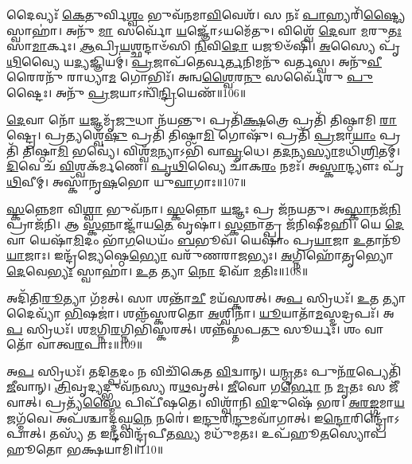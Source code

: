 𑌦𑍈𑌵𑍍𑌯𑌃᳴ \ul{𑌕𑍇}\-𑌤𑍁𑌰𑍍𑌵𑌿\-\ul{𑌶𑍍𑌵𑌂} 𑌭𑍁𑌵᳴𑌨𑌮𑌾\-\ul{𑌵𑌿}\-𑌵𑍇𑌶᳴।
𑌸 𑌨𑌃᳴ \ul{𑌪𑌾}\-𑌹𑍍𑌯𑌰𑌿᳴\-\ul{𑌷𑍍𑌟𑍍𑌯𑍈} 𑌸𑍍𑌵𑌾𑌹𑌾॑।
𑌅𑌨𑍁᳴ \ul{𑌮𑌾} 𑌸𑌰𑍍𑌵𑍋᳴ \ul{𑌯}\-𑌜𑍍𑌞𑍋᳴\-𑌽𑌯𑌮𑍇᳴𑌤𑍁।
𑌵𑌿𑌶𑍍𑌵𑍇᳴ \ul{𑌦𑍇}\-𑌵𑌾 \ul{𑌮}\-𑌰𑍁\-\ul{𑌤𑌃} 𑌸𑌾\-\ul{𑌮𑌾}\-𑌰𑍍𑌕𑌃।
\-\ul{𑌆}\-𑌪𑍍𑌰𑌿\-\ul{𑌯}\-𑌶𑍍𑌛𑌨𑍍𑌦𑌾𑍞᳴𑌸𑌿 \ul{𑌨𑌿}\-𑌵𑌿\-\ul{𑌦𑍋} 𑌯𑌜𑍂𑍞᳴𑌷𑌿।
\-\ul{𑌅}\-𑌸𑍍𑌯𑍈 𑌪𑍃᳴\-\ul{𑌥𑌿}\-𑌵𑍍𑌯𑍈 𑌯\-\ul{𑌦𑍍𑌯}\-𑌜𑍍𑌞𑌿𑌯𑌮𑍍॑।
\-\ul{𑌪𑍍𑌰}\-𑌜𑌾𑌪᳴𑌤𑍇𑌰𑍍𑌵\-\ul{𑌰𑍍𑌤}\-𑌨𑌿𑌮𑌨𑍁᳴ 𑌵𑌰𑍍𑌤𑌸𑍍𑌵।
𑌅𑌨𑍁᳴\-\ul{𑌵𑍀}\-𑌰𑍈𑌰𑌨𑍁᳴ 𑌰𑌾𑌧𑍍𑌯𑌾\-\ul{𑌮} 𑌗𑍋𑌭𑌿𑌃᳴।
𑌅𑌨𑍍𑌵\-\ul{𑌶𑍍𑌵𑍈}\-𑌰\-\ul{𑌨𑍁}\- 𑌸𑌰𑍍𑌵𑍈᳴𑌰𑍁 \ul{𑌪𑍁}\-𑌷𑍍𑌟𑍈𑌃।
𑌅𑌨𑍁᳴ \ul{𑌪𑍍𑌰}\-𑌜𑌯𑌾\-𑌽𑌨𑍍𑌵𑌿᳴\-\ul{𑌨𑍍𑌦𑍍𑌰𑌿}\-𑌯𑍇𑌣᳴॥106॥

\-\ul{𑌦𑍇}\-𑌵𑌾 𑌨𑍋᳴ \ul{𑌯}\-𑌜𑍍𑌞𑌮𑍃᳴\-\ul{𑌜𑍁}\-𑌧𑌾 𑌨᳴𑌯𑌨𑍍𑌤𑍁।
𑌪𑍍𑌰𑌤𑌿᳴\-\-\ul{𑌕𑍍𑌷}\-𑌤𑍍𑌰𑍇 𑌪𑍍𑌰𑌤𑌿᳴ 𑌤𑌿𑌷𑍍𑌠𑌾𑌮𑌿 \ul{𑌰𑌾}\-𑌷𑍍𑌟𑍍𑌰𑍇।
𑌪𑍍𑌰𑌤𑍍𑌯𑌶𑍍𑌵𑍇᳴\-\ul{𑌷𑍁} 𑌪𑍍𑌰𑌤𑌿᳴ 𑌤𑌿𑌷𑍍𑌠𑌾\-\ul{𑌮𑌿} 𑌗𑍋𑌷𑍁᳴।
𑌪𑍍𑌰𑌤𑌿᳴ \ul{𑌪𑍍𑌰}\-𑌜𑌾\-\ul{𑌯𑌾𑌂} 𑌪𑍍𑌰𑌤𑌿᳴ 𑌤𑌿𑌷𑍍𑌠𑌾\-\ul{𑌮𑌿} 𑌭𑌵𑍍𑌯𑍇॑।
𑌵𑌿𑌶𑍍𑌵᳴\-\ul{𑌮}\-𑌨𑍍𑌯𑌾𑌽𑌭𑌿᳴ 𑌵𑌾\-\ul{𑌵𑍃}\-𑌧𑍇।
𑌤\-\ul{𑌦}\-𑌨𑍍𑌯\-\ul{𑌸𑍍𑌯𑌾}\-𑌮𑌧𑌿᳴\-\ul{𑌶𑍍𑌰𑌿}\-𑌤𑌮𑍍।
\-\ul{𑌦𑌿}\-𑌵𑍇 𑌚᳴ \ul{𑌵𑌿}\-𑌶𑍍𑌵𑌕᳴𑌰𑍍𑌮𑌣𑍇।
\-\ul{𑌪𑍃}\-\-\ul{𑌥𑌿}\-𑌵𑍍𑌯𑍈 𑌚𑌾᳴𑌕\-\ul{𑌰𑌂} 𑌨𑌮𑌃᳴।
𑌅\-\ul{𑌸𑍍𑌕𑌾}\-𑌨𑍍𑌦𑍍𑌯𑍗𑌃 𑌪𑍃᳴\-\ul{𑌥𑌿}\-𑌵𑍀𑌮𑍍।
𑌅𑌸𑍍𑌕𑌾᳴𑌨𑍃\-\ul{𑌷}\-𑌭𑍋 𑌯𑍁\-\ul{𑌵𑌾}\-𑌗𑌾𑌃॥107॥

\-\ul{𑌸𑍍𑌕}\-𑌨𑍍𑌨𑍇𑌮𑌾 𑌵𑌿\-\ul{𑌶𑍍𑌵𑌾} 𑌭𑍁𑌵᳴𑌨𑌾।
\-\ul{𑌸𑍍𑌕}\-𑌨𑍍𑌨𑍋 \ul{𑌯}\-𑌜𑍍𑌞𑌃 𑌪𑍍𑌰 𑌜᳴𑌨𑌯𑌤𑍁।
𑌅\-\ul{𑌸𑍍𑌕𑌾}\-𑌨𑌜᳴\-\ul{𑌨𑌿} 𑌪𑍍𑌰𑌾𑌜᳴𑌨𑌿।
𑌆 \ul{𑌸𑍍𑌕}\-𑌨𑍍𑌨𑌾𑌜𑍍𑌜𑌾᳴𑌯\-\ul{𑌤𑍇} 𑌵𑍃𑌷𑌾॑।
\-\ul{𑌸𑍍𑌕}\-𑌨𑍍𑌨𑌾𑌤𑍍𑌪𑍍𑌰 𑌜᳴𑌨𑌿𑌷𑍀𑌮𑌹𑌿।
𑌯𑍇 \ul{𑌦𑍇}\-𑌵𑌾 𑌯𑍇𑌷𑌾᳴\-\ul{𑌮𑌿}\-𑌦𑌂 𑌭𑌾᳴\-\ul{𑌗}\-𑌧𑍇𑌯𑌂᳴ \ul{𑌬}\-𑌭𑍂𑌵᳴।
𑌯𑍇𑌷𑌾𑌂॑ 𑌪𑍍𑌰\-\ul{𑌯𑌾}\-𑌜𑌾 \ul{𑌉}\-𑌤𑌾𑌨𑍂᳴\-\ul{𑌯𑌾}\-𑌜𑌾𑌃।
𑌇𑌨𑍍𑌦𑍍𑌰᳴𑌜𑍍𑌯𑍇𑌷𑍍𑌠𑍇\-\ul{𑌭𑍍𑌯𑍋} 𑌵𑌰𑍁᳴𑌣𑌰𑌾𑌜𑌭𑍍𑌯𑌃।
\-\ul{𑌅}\-𑌗𑍍𑌨𑌿𑌹𑍋᳴𑌤𑍃𑌭𑍍𑌯𑍋 \ul{𑌦𑍇}\-𑌵𑍇\-\ul{𑌭𑍍𑌯𑌃} 𑌸𑍍𑌵𑌾𑌹𑌾॑।
\-\ul{𑌉}\-𑌤 𑌤𑍍𑌯𑌾 \ul{𑌨𑍋} 𑌦𑌿𑌵𑌾᳴ \ul{𑌮}\-𑌤𑌿𑌃॥108॥

𑌅𑌦𑌿᳴𑌤𑌿\-\ul{𑌰𑍂}\-𑌤𑍍𑌯𑌾 𑌗᳴𑌮𑌤𑍍।
𑌸𑌾 𑌶𑌨𑍍𑌤𑌾᳴\-\ul{𑌚𑍀} 𑌮𑌯᳴𑌸𑍍𑌕𑌰𑌤𑍍।
𑌅\-\ul{𑌪} 𑌸𑍍𑌰𑌿𑌧𑌃᳴।
\-\ul{𑌉}\-𑌤 𑌤𑍍𑌯𑌾 𑌦𑍈𑌵𑍍𑌯𑌾᳴ \ul{𑌭𑌿}\-𑌷𑌜𑌾॑।
𑌶𑌨𑍍𑌨᳴𑌸𑍍𑌕𑌰𑌤𑍋 \ul{𑌅}\-𑌶𑍍𑌵𑌿𑌨𑌾॑।
\-\ul{𑌯𑍂}\-𑌯𑌾𑌤𑌾᳴\-\ul{𑌮}\-𑌸𑍍𑌮𑌦𑍍𑌰𑌪𑌃᳴।
𑌅\-\ul{𑌪} 𑌸𑍍𑌰𑌿𑌧𑌃᳴।
𑌶\-\ul{𑌮}\-𑌗𑍍𑌨𑌿\-\ul{𑌰}\-𑌗𑍍𑌨𑌿𑌭𑌿᳴𑌸𑍍𑌕𑌰𑌤𑍍।
𑌶𑌨𑍍𑌨᳴𑌸𑍍𑌤𑌪\-\ul{𑌤𑍁} 𑌸𑍂𑌰𑍍𑌯𑌃᳴।
𑌶𑌂 𑌵𑌾𑌤𑍋᳴ 𑌵𑌾𑌤𑍍𑌵\-\ul{𑌰}\-𑌪𑌾𑌃॥109॥

𑌅\-\ul{𑌪} 𑌸𑍍𑌰𑌿𑌧𑌃᳴।
𑌤𑌦𑌿\-\ul{𑌤𑍍𑌪}\-𑌦𑌂 𑌨 𑌵𑌿𑌚𑌿᳴𑌕𑍇𑌤 \ul{𑌵𑌿}\-𑌦𑍍𑌵𑌾𑌨𑍍।
𑌯\-\ul{𑌨𑍍𑌮𑍃}\-𑌤𑌃 𑌪𑍁𑌨᳴\-\ul{𑌰}\-𑌪𑍍𑌯𑍇𑌤𑌿᳴ \ul{𑌜𑍀}\-𑌵𑌾𑌨𑍍।
\-\ul{𑌤𑍍𑌰𑌿}\-𑌵𑍃𑌦𑍍𑌯𑌦𑍍𑌭𑍁𑌵᳴𑌨𑌸𑍍𑌯 𑌰\-\ul{𑌥}\-𑌵𑍃𑌤𑍍।
\-\ul{𑌜𑍀}\-𑌵𑍋 𑌗\-\ul{𑌰𑍍𑌭𑍋} 𑌨 \ul{𑌮𑍃}\-𑌤𑌃 𑌸 𑌜𑍀᳴𑌵𑌾𑌤𑍍।
𑌪𑍍𑌰𑌤𑍍𑌯᳴\-\ul{𑌸𑍍𑌮𑍈} 𑌪𑌿𑌪𑍀᳴𑌷𑌤𑍇।
𑌵𑌿𑌶𑍍𑌵𑌾᳴𑌨𑌿 \ul{𑌵𑌿}\-𑌦𑍁𑌷𑍇᳴ 𑌭𑌰।
\-\ul{𑌅}\-\-\ul{𑌰}\-\-\ul{𑌙𑍍𑌗}\-𑌮𑌾\-\ul{𑌯} 𑌜𑌗𑍍𑌮᳴𑌵𑍇।
𑌅𑌪᳴𑌶𑍍𑌚𑌾𑌦𑍍𑌦𑌘𑍍𑌵\-\ul{𑌨𑍇} 𑌨𑌰𑍇॑।
𑌇\-\ul{𑌨𑍍𑌦𑍁}\-𑌰𑌿\-\ul{𑌨𑍍𑌦𑍁}\-𑌮𑌵𑌾᳴𑌗𑌾𑌤𑍍।
𑌇\-\ul{𑌨𑍍𑌦𑍋}\-𑌰𑌿𑌨𑍍𑌦𑍍𑌰𑍋᳴\-𑌽𑌪𑌾𑌤𑍍।
𑌤𑌸𑍍𑌯᳴ 𑌤 𑌇\-\ul{𑌨𑍍𑌦}\-𑌵𑌿𑌨𑍍𑌦𑍍𑌰᳴𑌪𑍀𑌤\-\ul{𑌸𑍍𑌯} 𑌮𑌧𑍁᳴𑌮𑌤𑌃।
𑌉𑌪᳴𑌹𑍂\-\ul{𑌤}\-𑌸𑍍𑌯𑍋𑌪᳴𑌹𑍂𑌤𑍋 𑌭𑌕𑍍𑌷𑌯𑌾𑌮𑌿॥110॥\anuvakamend[\-\ul{𑌉}\-\-\ul{𑌦}\-\-\ul{𑌰𑍍}\-𑌷 𑌇᳴\-\ul{𑌨𑍍𑌦𑍍𑌰𑌿}\-𑌯𑍇\-\ul{𑌣} 𑌗𑌾 \ul{𑌮}\-𑌤𑌿𑌰᳴\-\ul{𑌰}\-𑌪𑌾 𑌅᳴\-\ul{𑌗𑌾}\-𑌤𑍍𑌰𑍀𑌣𑌿᳴ 𑌚]

